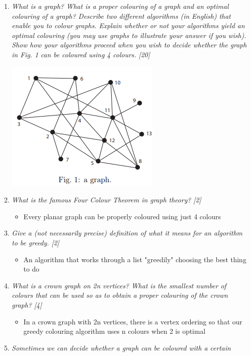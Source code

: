 \documentclass{article}[18pt]
\begin{document}
\begin{enumerate}
	
	\item \textit{What is a graph? What is a proper colouring of a graph and an optimal
		colouring of a graph? Describe two different algorithms (in English)
		that enable you to colour graphs. Explain whether or not your
		algorithms yield an optimal colouring (you may use graphs to illustrate
		your answer if you wish). Show how your algorithms proceed when you
		wish to decide whether the graph in Fig. 1 can be coloured using 4
		colours. [20]}
	\begin{center}
		\includegraphics[scale=0.7]{graph}
	\end{center}
	\item \textit{What is the famous Four Colour Theorem in graph theory? [2]}
	\begin{itemize}
		\item Every planar graph can be properly coloured using just 4 colours
	\end{itemize}
	\item \textit{Give a (not necessarily precise) definition of what it means for an algorithm to be greedy. [2]}
	\begin{itemize}
		\item An algorithm that works through a list "greedily" choosing the best thing to do
	\end{itemize}
	\item \textit{What is a crown graph on 2n vertices? What is the smallest number
		of colours that can be used so as to obtain a proper colouring of the
		crown graph? [4]}
	\begin{itemize}
		\item In a crown graph with 2n vertices, there is a vertex ordering so that our greedy colouring algorithm uses n colours when 2 is optimal
	\end{itemize}
	\item \textit{Sometimes we can decide whether a graph can be coloured with a certain
}
\end{enumerate}
\end{document}
